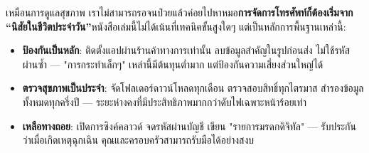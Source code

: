 
เหมือนการดูแลสุขภาพ เราไม่สามารถรอจนป่วยแล้วค่อยไปหาหมอ\textbf{การจัดการโทรศัพท์ก็ต้องเริ่มจาก “นิสัยในชีวิตประจำวัน”}หนังสือเล่มนี้ไม่ได้เน้นที่เทคนิคขั้นสูงใดๆ แต่เป็นหลักการพื้นฐานเหล่านี้:

\begin{itemize}
  \item \textbf{ป้องกันเป็นหลัก}: ติดตั้งแอปผ่านร้านค้าทางการเท่านั้น ลบข้อมูลสำคัญในรูปก่อนส่ง ไม่ใช้รหัสผ่านซ้ำ — "การกระทำเล็กๆ" เหล่านี้มีต้นทุนต่ำมาก แต่ป้องกันความเสี่ยงส่วนใหญ่ได้
  \item \textbf{ตรวจสุขภาพเป็นประจำ}: จัดโฟลเดอร์ดาวน์โหลดทุกเดือน ตรวจสอบสิทธิ์ทุกไตรมาส สำรองข้อมูลทั้งหมดทุกครึ่งปี — ระยะห่างคงที่มีประสิทธิภาพมากกว่าดับไฟเฉพาะหน้าร้อยเท่า
  \item \textbf{เหลือทางถอย}: เปิดการซิงค์คลาวด์ จดรหัสผ่านบัญชี เขียน "รายการมรดกดิจิทัล" — รับประกันว่าเมื่อเกิดเหตุฉุกเฉิน คุณและครอบครัวสามารถรับมือได้อย่างสงบ
\end{itemize}
